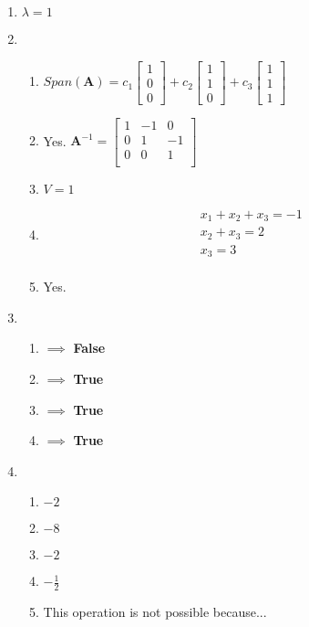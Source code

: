 \documentclass[fleqn]{article}[11pt]
\begin{document}
\begin{enumerate}
	\item $\lambda=1$
	
	\item
		\begin{enumerate}[label=\alph*.]
			\item \(Span(\mathbf{A})= c_1\begin{bmatrix} 1 \\ 0 \\ 0 \end{bmatrix}+c_2\begin{bmatrix} 1 \\ 1 \\ 0 \end{bmatrix}+c_3\begin{bmatrix} 1 \\ 1 \\ 1 \end{bmatrix}\)
			
			\item Yes. \(\mathbf{A}^{-1}=\begin{bmatrix}									    			1 & -1 & 0 \\
								0 & 1 & -1 \\
								0 & 0 & 1 \\
							    \end{bmatrix}\)
			
			\item $V=1$
			
			\item \begin{eqnarray*}
					x_1+x_2+x_3=-1 \\
					x_2+x_3=2 \\
					x_3=3 \\
				\end{eqnarray*}
			
			\item Yes.
		\end{enumerate}
	
	\item 
		\begin{enumerate}
			\item $\implies$ \textbf{False} 
			\item $\implies$ \textbf{True}
			\item $\implies$ \textbf{True}
			\item $\implies$ \textbf{True}
		\end{enumerate}
	
	\item 
		\begin{enumerate}[label=\alph*.]
			\item $-2$
			\item $-8$
			\item $-2$
			\item $-\frac{1}{2}$
			\item This operation is not possible because...
		\end{enumerate}
		

\end{enumerate}
\end{document}

